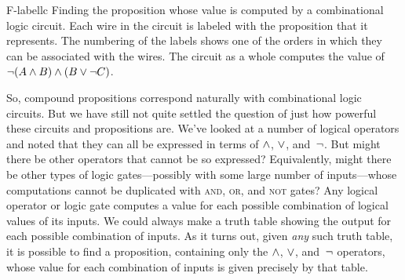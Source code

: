 \fig
    {F-labellc}
    {Finding the proposition whose value is computed by a
     combinational logic circuit.  Each wire in the circuit is
     labeled with the proposition that it represents.  The
     numbering of the labels shows one of the orders in which they 
     can be associated with the wires.  The circuit as a whole
     computes the value of $\lnot(A\wedge B)\wedge(B\vee\lnot C)$.}
    {}

\medbreak
   
So, compound propositions correspond naturally with combinational
logic circuits.  But we have still not quite settled the question
of just how powerful these circuits and propositions are.
We've looked at a number of logical operators and noted that they
can all be expressed in terms of $\wedge$, $\vee$, and~$\lnot$.
But might there be other operators that cannot be so expressed?
Equivalently, might there be other types of logic gates---possibly
with some large number of inputs---whose
computations cannot be duplicated with \textsc{and}, \textsc{or}, and
\textsc{not} gates?   Any logical operator or logic gate computes
a value for each possible combination of logical values of its inputs.
We could always make a truth table showing the output for each 
possible combination of inputs.  As it turns out, given \emph{any} such
truth table, it is possible to find a proposition, containing only
the $\wedge$, $\vee$, and~$\lnot$ operators, whose value for each combination
of inputs is given precisely by that table.    

